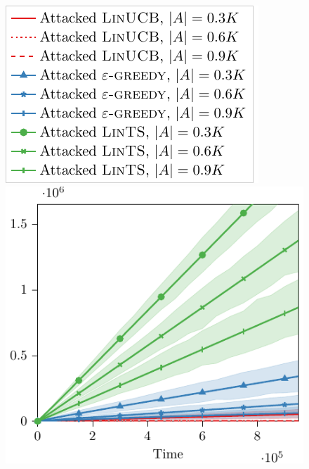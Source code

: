 \begin{figure}
\begin{minipage}{0.25\linewidth}
        \includegraphics[width=0.85\linewidth]{images/regret_cost_attacks_context/simulations/legend.pdf}
    \end{minipage}\hfill
    \begin{minipage}{0.25\linewidth}
    \centering
    \includegraphics[width=0.95\linewidth]{images/regret_cost_attacks_context/simulations/cost_context_attack_simulations.pdf}
    \end{minipage}\hfill
    \begin{minipage}{0.25\linewidth}
    \centering

\end{minipage}
\end{figure}
